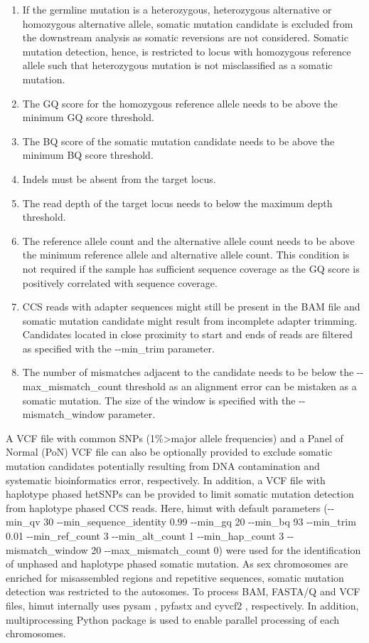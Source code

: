 \begin{enumerate}
\item If the germline mutation is a heterozygous, heterozygous alternative or homozygous alternative allele, somatic mutation candidate is excluded from the downstream analysis as somatic reversions are not considered. Somatic mutation detection, hence, is restricted to locus with homozygous reference allele such that heterozygous mutation is not misclassified as a somatic mutation.
\item The GQ score for the homozygous reference allele needs to be above the minimum GQ score threshold.
\item The BQ score of the somatic mutation candidate needs to be above the minimum BQ score threshold.
\item Indels must be absent from the target locus.
\item The read depth of the target locus needs to below the maximum depth threshold.
\item The reference allele count and the alternative allele count needs to be above the minimum reference allele and alternative allele count. This condition is not required if the sample has sufficient sequence coverage as the GQ score is positively correlated with sequence coverage.
\item CCS reads with adapter sequences might still be present in the BAM file and somatic mutation candidate might result from incomplete adapter trimming. Candidates located in close proximity to start and ends of reads are filtered as specified with the -{}-min\_trim parameter. 
\item The number of mismatches adjacent to the candidate needs to be below the -{}-max\_mismatch\_count threshold as an alignment error can be mistaken as a somatic mutation. The size of the window is specified with the -{}-mismatch\_window parameter. 
\end{enumerate}

A VCF file with common SNPs (1\%>major allele frequencies) and a Panel of Normal (PoN) VCF file can also be optionally provided to exclude somatic mutation candidates potentially resulting from DNA contamination and systematic bioinformatics error, respectively. In addition, a VCF file with haplotype phased hetSNPs can be provided to limit somatic mutation detection from haplotype phased CCS reads. Here, himut with default parameters (-{}-min\_qv 30 -{}-min\_sequence\_identity 0.99 -{}-min\_gq 20 -{}-min\_bq 93 -{}-min\_trim 0.01 -{}-min\_ref\_count 3 -{}-min\_alt\_count 1 -{}-min\_hap\_count 3 -{}-mismatch\_window 20 -{}-max\_mismatch\_count 0) were used for the identification of unphased and haplotype phased somatic mutation. As sex chromosomes are enriched for misassembled regions and repetitive sequences, somatic mutation detection was restricted to the autosomes. To process BAM, FASTA/Q and VCF files, himut internally uses pysam \cite{pysam}, pyfastx \cite{Du2021-ya} and cyvcf2 \cite{Pedersen2017-ld}, respectively. In addition, multiprocessing Python package is used to enable parallel processing of each chromosomes. 

